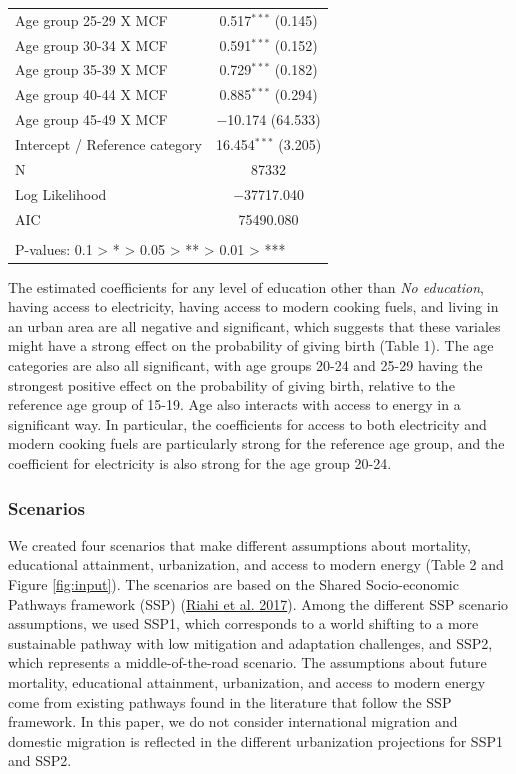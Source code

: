 \documentclass[
]{article}
\begin{document}
\begin{table}[!htbp]
\begin{tabular}{@{\extracolsep{5pt}}lc}
  Age group 25-29 X MCF & 0.517$^{***}$ (0.145) \\ 
  Age group 30-34 X MCF & 0.591$^{***}$ (0.152) \\ 
  Age group 35-39 X MCF & 0.729$^{***}$ (0.182) \\ 
  Age group 40-44 X MCF & 0.885$^{***}$ (0.294) \\ 
  Age group 45-49 X MCF & $-$10.174 (64.533) \\ 
  Intercept / Reference category & 16.454$^{***}$ (3.205) \\ 
 N & 87332 \\ 
Log Likelihood & $-$37717.040 \\ 
AIC & 75490.080 \\ 
\hline \\[-1.8ex] 
\multicolumn{2}{l}{P-values: 0.1 > * > 0.05 > ** > 0.01 > ***} \\ 
\end{tabular} 
\end{table}

The estimated coefficients for any level of education other than \emph{No education}, having access to electricity, having access to modern cooking fuels, and living in an urban area are all negative and significant, which suggests that these variales might have a strong effect on the probability of giving birth (Table 1). The age categories are also all significant, with age groups 20-24 and 25-29 having the strongest positive effect on the probability of giving birth, relative to the reference age group of 15-19. Age also interacts with access to energy in a significant way. In particular, the coefficients for access to both electricity and modern cooking fuels are particularly strong for the reference age group, and the coefficient for electricity is also strong for the age group 20-24.

\newpage

\hypertarget{scenario}{%
\subsubsection{Scenarios}\label{scenario}}

We created four scenarios that make different assumptions about mortality, educational attainment, urbanization, and access to modern energy (Table 2 and Figure \ref{fig:input}). The scenarios are based on the Shared Socio-economic Pathways framework (SSP) (\protect\hyperlink{ref-riahi_shared_2017}{Riahi et al. 2017}). Among the different SSP scenario assumptions, we used SSP1, which corresponds to a world shifting to a more sustainable pathway with low mitigation and adaptation challenges, and SSP2, which represents a middle-of-the-road scenario. The assumptions about future mortality, educational attainment, urbanization, and access to modern energy come from existing pathways found in the literature that follow the SSP framework. In this paper, we do not consider international migration and domestic migration is reflected in the different urbanization projections for SSP1 and SSP2.
\end{document}
